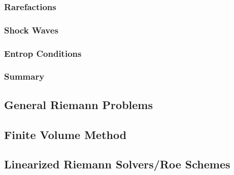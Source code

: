 \documentclass[
  fourColumns,
  landscape
]{formularyETH/formularyETH}
\begin{document}
      \subsubsection{Rarefactions}\label{subsubsec:rarefactions}
        
      \subsubsection{Shock Waves}\label{subsubsec:shock_waves}
        
      \subsubsection{Entrop Conditions}\label{subsubsec:entrop_conditions}
        
        \label{subsubsubsec:lax_entropy_condition}
        
      \subsubsection{Summary}
        
      \subsection{General Riemann Problems}\label{subsec:general_riemann_problems}
        
\vfill\columnbreak
  \subsection*{Finite Volume Method}
  
  \subsection{Linearized Riemann Solvers/Roe Schemes}\label{subsubsubsec:properties}
      
\end{document}

